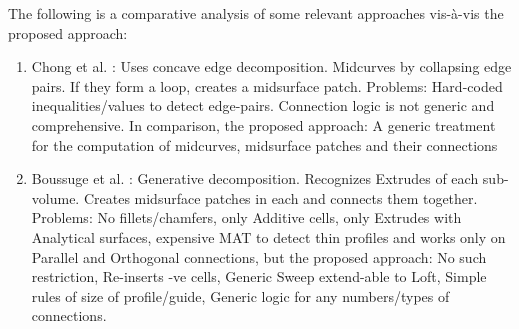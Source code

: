 



The following is a comparative analysis of some relevant approaches vis-à-vis the proposed approach:

\begin{enumerate}
    \item Chong et al. \cite{Chong2004}: Uses concave edge decomposition. Midcurves by collapsing edge pairs. If they form a loop, creates a midsurface patch. Problems: Hard-coded inequalities/values to detect edge-pairs. Connection logic is not generic and comprehensive. In comparison, the proposed approach: A generic treatment for the computation of midcurves, midsurface patches and their connections
    \item Boussuge et al. \cite{Boussuge2014}: Generative decomposition. Recognizes Extrudes of each sub-volume. Creates midsurface patches in each and connects them together. Problems: No fillets/chamfers, only Additive cells, only Extrudes with Analytical surfaces, expensive MAT to detect thin profiles and works only on Parallel and Orthogonal connections, but the proposed approach: No such restriction, Re-inserts -ve cells, Generic Sweep extend-able to Loft, Simple rules of size of profile/guide, Generic logic for any numbers/types of connections.
\end{enumerate}